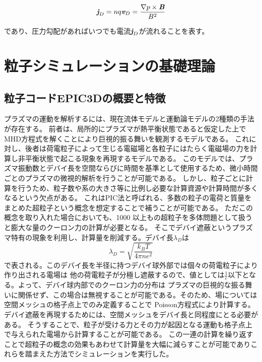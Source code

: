 \documentclass[a4paper,11pt,titlepage]{jarticle}
\numberwithin{equation}{section} %
\begin{document}
\begin{eqnarray}
  \textit{\textbf{j}}_D = nq \textit{\textbf{v}}_{D}  = \frac{\nabla p \times \textit{\textbf{B}}}{B^2}
\end{eqnarray}

であり、圧力勾配があればいつでも電流$\textit{\textbf{j}}_D$が流れることを表す。
  \newpage 


\section{粒子シミュレーションの基礎理論}
  \subsection{粒子コードEPIC3Dの概要と特徴}
  プラズマの運動を解析するには、現在流体モデルと運動論モデルの2種類の手法が存在する。
  前者は、局所的にプラズマが熱平衡状態であると仮定した上でMHD方程式を解くことにより巨視的振る舞いを観測するモデルである。
  これに対し、後者は荷電粒子によって生じる電磁場と各粒子にはたらく電磁場の力を計算し非平衡状態で起こる現象を再現するモデルである。
  このモデルでは、プラズマ振動数とデバイ長を空間ならびに時間を基準として使用するため、微小時間ごとのプラズマの微視的解析を行うことが可能である。
  しかし、粒子ごとに計算を行うため、粒子数や系の大きさ等に比例し必要な計算資源や計算時間が多くなるという欠点がある。
  これはPIC法と呼ばれる、多数の粒子の電荷と質量をまとめた超粒子という概念を想定することで補うことが可能である。
  ただこの概念を取り入れた場合においても、1000 以上もの超粒子を多体問題として扱うと膨大な量のクーロン力の計算が必要となる。
  そこでデバイ遮蔽というプラズマ特有の現象を利用し、計算量を削減する。デバイ長$\lambda_D$は
  \begin{equation}
    \label{3-1-1}
    \lambda_D = \sqrt{\frac{k_B T}{4\pi n e^2}}
  \end{equation}
  で表される。このデバイ長を半径に持つデバイ球外部では個々の荷電粒子により作り出される電場は
  他の荷電粒子が分極し遮蔽するので、値としては$\frac{1}{e}$以下となる。よって、デバイ球内部でのクーロン力の分布は
  プラズマの巨視的な振る舞いに関係せず、この場合は無視することが可能である。そのため、場については空間メッシュの格子点上でのみ定義することで
  Poisson方程式により計算する。デバイ遮蔽を再現するためには、空間メッシュをデバイ長と同程度にとる必要がある。
  そうすることで、粒子が受ける力とその力が起因となる運動も格子点上で与えられた電場から計算することが可能である。
  この一連の計算を繰り返すことで超粒子の概念の効果もあわせて計算量を大幅に減らすことが可能でありこれらを踏まえた方法でシミュレーションを実行した。
\end{document}
